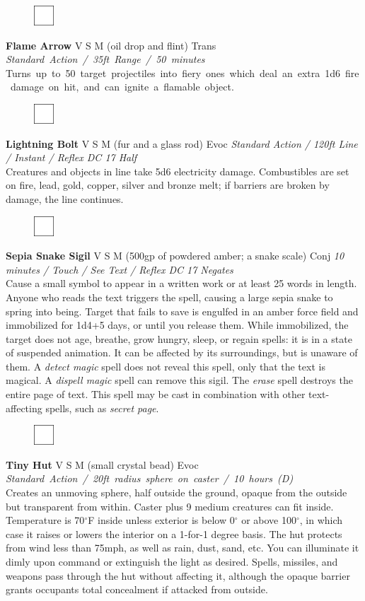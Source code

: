 \documentclass[letterpaper]{article}
\newcommand{\spell}[7]{
\begin{figure}
\vspace{-13pt}
\ifstrequal{#2}{Full}{\includegraphics[width=2em]{Checkbox-Full}}{
                      \includegraphics[width=2em]{Checkbox}}
\ifstrequal{#7}{}{\vspace{-1em}}{\vspace{#7}}
\end{figure}
\noindent \textbf{#1} #3 {
    \ifstrequal{#4}{Conj}{\color{Plum}Conj}{%
    \ifstrequal{#4}{Divin}{\color{YellowOrange}Divin}{%
    \ifstrequal{#4}{Ench}{\color{VioletRed}Ench}{%
    \ifstrequal{#4}{Trans}{\color{LimeGreen}Trans}{%
    \ifstrequal{#4}{Evoc}{\color{RedOrange}Evoc}{%
    \ifstrequal{#4}{Illu}{\color{ProcessBlue}Illu}{%
    \ifstrequal{#4}{Abjur}{\color{CadetBlue}Abjur}{%
    \ifstrequal{#4}{Necro}{\color{Red}Necro}{%
}}}}}}}}}
{\footnotesize \emph{#5}} \\
#6
}
\begin{document}
\spell{Flame Arrow}{}{V S M (oil drop and flint)}{Trans}{\mbox{Standard Action / 35ft Range / 50 minutes}}{%
\mbox{Turns up to 50 target projectiles into fiery ones which deal an extra 1d6 fire damage on hit, and can ignite a flamable object.}}{}\\[-1em] %

\spell{Lightning Bolt}{}{V S M (fur and a glass rod)}{Evoc}{Standard Action / 120ft Line / Instant / Reflex DC 17 Half}{%
Creatures and objects in line take 5d6 electricity damage. Combustibles are set on fire, lead, gold, copper, silver and bronze melt; if barriers are broken by damage, the line continues.}{} %


\spell{Sepia Snake Sigil}{}{V S M (500gp of powdered amber; a snake scale)}{Conj}{\emph{10 minutes / Touch / See Text / Reflex DC 17 Negates}}{%
Cause a small symbol to appear in a written work or at least 25 words in length.  Anyone who reads the text triggers the spell, causing a large sepia snake to spring into being.  Target that fails to save is engulfed in an amber force field and immobilized for 1d4+5 days, or until you release them.  While immobilized, the target does not age, breathe, grow hungry, sleep, or regain spells: it is in a state of suspended animation.  It can be affected by its surroundings, but is unaware of them.  A \emph{detect magic} spell does not reveal this spell, only that the text is magical.  A \emph{dispell magic} spell can remove this sigil.  The \emph{erase} spell destroys the entire page of text.  This spell may be cast in combination with other text-affecting spells, such as \emph{secret page}.}{5em}\\[-1em] %

\spell{Tiny Hut}{}{V S M (small crystal bead)}{Evoc}{\mbox{Standard Action / 20ft radius sphere on caster /  10 hours (D)}}{%
Creates an unmoving sphere, half outside the ground, opaque from the outside but transparent from within.  Caster plus 9 medium creatures can fit inside.  Temperature is 70$^{\circ}$F inside unless exterior is below 0$^{\circ}$ or above 100$^{\circ}$, in which case it raises or lowers the interior on a 1-for-1 degree basis.  The hut protects from wind less than 75mph, as well as rain, dust, sand, etc.  You can illuminate it dimly upon command or extinguish the light as desired.  Spells, missiles, and weapons pass through the hut without affecting it, although the opaque barrier grants occupants total concealment if attacked from outside.}{2em} %
\end{document}
